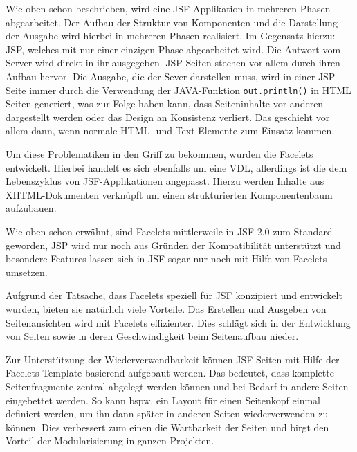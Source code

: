 Wie oben schon beschrieben, wird eine JSF Applikation in mehreren Phasen abgearbeitet. Der Aufbau der Struktur von Komponenten und die Darstellung der Ausgabe wird hierbei in mehreren Phasen realisiert.
Im Gegensatz hierzu: JSP, welches mit nur einer einzigen Phase abgearbeitet wird. Die Antwort vom Server wird direkt in ihr ausgegeben. JSP Seiten stechen vor allem durch ihren Aufbau hervor.
Die Ausgabe, die der Sever darstellen muss, wird in einer JSP-Seite immer durch die Verwendung der JAVA-Funktion \texttt{out.println()} in HTML Seiten generiert, was zur Folge haben kann, dass Seiteninhalte vor anderen dargestellt werden oder das Design an Konsistenz verliert. Das geschieht vor allem dann, wenn normale HTML- und Text-Elemente zum Einsatz kommen.

Um diese Problematiken in den Griff zu bekommen, wurden die Facelets entwickelt. Hierbei handelt es sich ebenfalls um eine VDL, allerdings ist die dem Lebenszyklus von JSF-Applikationen angepasst.
Hierzu werden Inhalte aus XHTML-Dokumenten verknüpft um einen strukturierten Komponentenbaum aufzubauen.

	

Wie oben schon erwähnt, sind Facelets mittlerweile in JSF 2.0 zum Standard geworden, JSP wird nur noch aus Gründen der Kompatibilität unterstützt und besondere Features lassen sich in JSF sogar nur noch mit Hilfe von Facelets umsetzen. 

Aufgrund der Tatsache, dass Facelets speziell für JSF konzipiert und entwickelt wurden, bieten sie natürlich viele Vorteile.
Das Erstellen und Ausgeben von Seitenansichten wird mit Facelets effizienter. 
Dies schlägt sich in der Entwicklung von Seiten sowie in deren Geschwindigkeit beim Seitenaufbau nieder.

Zur Unterstützung der Wiederverwendbarkeit können JSF Seiten mit Hilfe der Facelets Template-basierend aufgebaut werden. Das bedeutet, dass komplette Seitenfragmente zentral abgelegt werden können und bei Bedarf in andere Seiten eingebettet werden. So kann bspw. ein Layout für einen Seitenkopf einmal definiert werden, um ihn dann später in anderen Seiten wiederverwenden zu können.
Dies verbessert zum einen die Wartbarkeit der Seiten und birgt den Vorteil der Modularisierung in ganzen Projekten.


